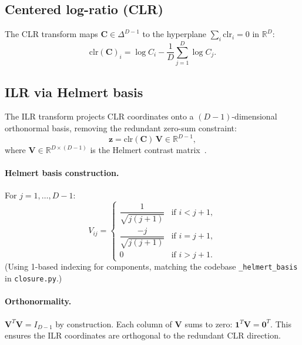 \documentclass[11pt]{article}
\newcommand{\CC}{\mathbf{C}}
\newcommand{\zz}{\mathbf{z}}
\newcommand{\VV}{\mathbf{V}}
\newcommand{\ones}{\mathbf{1}}
\begin{document}
\subsection{Centered log-ratio (CLR)}

The CLR transform maps $\CC \in \Delta^{D-1}$ to the hyperplane
$\sum_i \mathrm{clr}_i = 0$ in $\mathbb{R}^D$:
%
\begin{equation}
  \label{eq:clr}
  \mathrm{clr}(\CC)_i = \log C_i - \frac{1}{D}\sum_{j=1}^D \log C_j.
\end{equation}
%

\subsection{ILR via Helmert basis}

The ILR transform projects CLR coordinates onto a $(D{-}1)$-dimensional
orthonormal basis, removing the redundant zero-sum constraint:
%
\begin{equation}
  \label{eq:ilr}
  \zz = \mathrm{clr}(\CC)\,\VV \in \mathbb{R}^{D-1},
\end{equation}
%
where $\VV \in \mathbb{R}^{D \times (D-1)}$ is the Helmert contrast
matrix~\cite{egozcue-2003}.

\paragraph{Helmert basis construction.}
For $j = 1, \ldots, D-1$:
%
\begin{equation}
  \label{eq:helmert}
  V_{ij} = \begin{cases}
    \dfrac{1}{\sqrt{j(j+1)}}     & \text{if } i < j+1, \\[6pt]
    \dfrac{-j}{\sqrt{j(j+1)}}    & \text{if } i = j+1, \\[4pt]
    0                             & \text{if } i > j+1.
  \end{cases}
\end{equation}
%
(Using 1-based indexing for components, matching the codebase
\texttt{\_helmert\_basis} in \texttt{closure.py}.)

\paragraph{Orthonormality.}
$\VV^T\VV = I_{D-1}$ by construction.  Each column of $\VV$ sums to
zero: $\ones^T \VV = \mathbf{0}^T$.  This ensures the ILR coordinates are
orthogonal to the redundant CLR direction.
\end{document}
